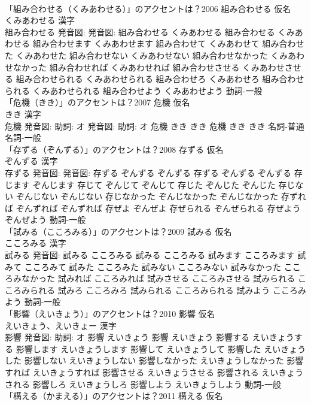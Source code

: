 \documentclass[8pt]{extreport}
\begin{document}
\begin{CJK}{UTF8}{min}
\\	「組み合わせる（くみあわせる）」のアクセントは？2006	組み合わせる 仮名　
\\	くみあわせる 漢字　
\\	組み合わせる 発音図: 発音図:	組み合わせる くみあわせる		組み合わせる くみあわせる 組み合わせます くみあわせます 組み合わせて くみあわせて 組み合わせた くみあわせた 組み合わせない くみあわせない 組み合わせなかった くみあわせなかった 組み合わせれば くみあわせれば 組み合わせさせる くみあわせさせる 組み合わせられる くみあわせられる 組み合わせろ くみあわせろ 組み合わせられる くみあわせられる 組み合わせよう くみあわせよう				動詞-一般 
\\	「危機（きき）」のアクセントは？2007	危機 仮名　
\\	きき 漢字　
\\	危機 発音図: 助詞: オ 発音図: 助詞: オ	危機 きき きき		危機 きき きき				名詞-普通名詞-一般 
\\	「存ずる（ぞんずる）」のアクセントは？2008	存ずる 仮名　
\\	ぞんずる 漢字　
\\	存ずる 発音図: 発音図:	存ずる ぞんずる ぞんずる		存ずる ぞんずる ぞんずる 存じます ぞんじます 存じて ぞんじて ぞんじて 存じた ぞんじた ぞんじた 存じない ぞんじない ぞんじない 存じなかった ぞんじなかった ぞんじなかった 存ずれば ぞんずれば ぞんずれば 存ぜよ ぞんぜよ 存ぜられる ぞんぜられる 存ぜよう ぞんぜよう				動詞-一般 
\\	「試みる（こころみる）」のアクセントは？2009	試みる 仮名　
\\	こころみる 漢字　
\\	試みる 発音図:	試みる こころみる		試みる こころみる 試みます こころみます 試みて こころみて 試みた こころみた 試みない こころみない 試みなかった こころみなかった 試みれば こころみれば 試みさせる こころみさせる 試みられる こころみられる 試みろ こころみろ 試みられる こころみられる 試みよう こころみよう				動詞-一般 
\\	「影響（えいきょう）」のアクセントは？2010	影響 仮名　
\\	えいきょう、えいきょー 漢字　
\\	影響 発音図: 助詞: オ	影響 えいきょう		影響 えいきょう 影響する えいきょうする 影響します えいきょうします 影響して えいきょうして 影響した えいきょうした 影響しない えいきょうしない 影響しなかった えいきょうしなかった 影響すれば えいきょうすれば 影響させる えいきょうさせる 影響される えいきょうされる 影響しろ えいきょうしろ 影響しよう えいきょうしよう				動詞-一般 
\\	「構える（かまえる）」のアクセントは？2011	構える 仮名　

\end{CJK}
\end{document}
